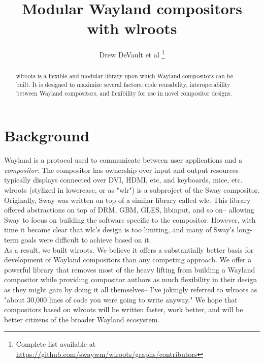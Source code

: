 \documentclass{article}
\begin{document}
\title{Modular Wayland compositors with wlroots}
\author{Drew DeVault et al
    \thanks{Complete list available at \url{https://github.com/swaywm/wlroots/graphs/contributors}}}
\maketitle

\begin{abstract}
wlroots is a flexible and modular library upon which Wayland compositors can be
built. It is designed to maximize several factors: code reusability,
interoperability between Wayland compositors, and flexibility for use in novel
compositor designs.
\end{abstract}

\newpage
\tableofcontents

\newpage
\section{Background}\label{background}

Wayland is a protocol used to communicate between user applications and a
\emph{compositor}. The compositor has ownership over input and output
resources-- typically displays connected over DVI, HDMI, etc, and keyboards,
mice, etc.\\

wlroots (stylized in lowercase, or as "wlr") is a subproject of the Sway
compositor. Originally, Sway was written on top of a similar library called wlc.
This library offered abstractions on top of DRM, GBM, GLES, libinput, and so
on-- allowing Sway to focus on building the software specific to the compositor.
However, with time it became clear that wlc's design is too limiting, and many
of Sway's long-term goals were difficult to achieve based on it.\\

As a result, we built wlroots. We believe it offers a substantially better
basis for development of Wayland compositors than any competing approach.
We offer a powerful library that removes most of the heavy lifting from building
a Wayland compositor while providing compositor authors as much flexibility in
their design as they might gain by doing it all themselves-- I've jokingly
referred to wlroots as
"about 30,000 lines of code you were going to write anyway." We hope that
compositors based on wlroots will be written faster, work better, and will
be better citizens of the broader Wayland ecosystem.
\end{document}
